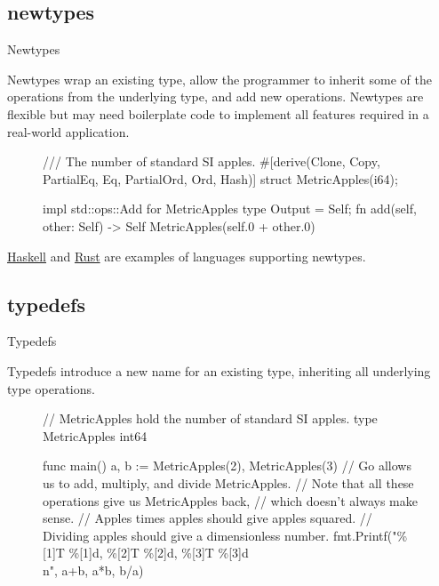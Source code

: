\documentclass{article}
\begin{document}
\subsection{newtypes}{Newtypes}

Newtypes wrap an existing type, allow the programmer to inherit some of the operations from the underlying type, and add new operations.
Newtypes are flexible but may need boilerplate code to implement all features required in a real-world application.

\begin{figure}
\begin{code}[rust]
/// The number of standard SI apples.
#[derive(Clone, Copy, PartialEq, Eq, PartialOrd, Ord, Hash)]
struct MetricApples(i64);

impl std::ops::Add for MetricApples {
  type Output = Self;
  fn add(self, other: Self) -> Self {
    MetricApples(self.0 + other.0)
  }
}
\end{code}
\end{figure}

\href{https://wiki.haskell.org/Newtype}{Haskell} and \href{https://doc.rust-lang.org/book/ch19-04-advanced-types.html#using-the-newtype-pattern-for-type-safety-and-abstraction}{Rust} are examples of languages supporting newtypes.

\subsection{typedefs}{Typedefs}

Typedefs introduce a new name for an existing type, inheriting all underlying type operations.

\begin{figure}
\begin{code}[go]
// MetricApples hold the number of standard SI apples.
type MetricApples int64

func main() {
  a, b := MetricApples(2), MetricApples(3)
  // Go allows us to add, multiply, and divide MetricApples.
  // Note that all these operations give us MetricApples back,
  // which doesn’t always make sense.
  // Apples times apples should give apples squared.
  // Dividing apples should give a dimensionless number.
  fmt.Printf("\%[1]T \%[1]d, \%[2]T \%[2]d, \%[3]T \%[3]d\\n", a+b, a*b, b/a)
}
\end{code}
\end{figure}
\end{document}
